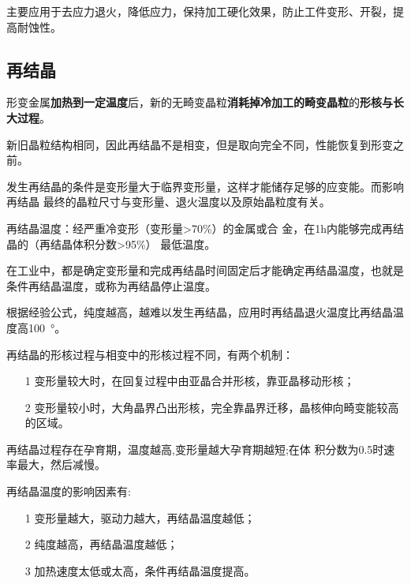             主要应用于去应力退火，降低应力，保持加工硬化效果，防止工件变形、开裂，提高耐蚀性。

        \subsection{再结晶}
            形变金属\textbf{加热到一定温度}后，新的无畸变晶粒\textbf{消耗掉冷加工的畸变晶粒}的\textbf{形核与长大过程}。

            新旧晶粒结构相同，因此再结晶不是相变，但是取向完全不同，性能恢复到形变之前。

            发生再结晶的条件是变形量大于临界变形量，这样才能储存足够的应变能。而影响再结晶
            最终的晶粒尺寸与变形量、退火温度以及原始晶粒度有关。

            再结晶温度：经严重冷变形（变形量>70\%）的金属或合
            金，在1h内能够完成再结晶的（再结晶体积分数>95\%）
            最低温度。
            
            在工业中，都是确定变形量和完成再结晶时间固定后才能确定再结晶温度，也就是条件再结晶温度，或称为再结晶停止温度。

            根据经验公式，纯度越高，越难以发生再结晶，应用时再结晶退火温度比再结晶温度高\SI{100}{\degree}。

            再结晶的形核过程与相变中的形核过程不同，有两个机制：
            \begin{itemize}
                \item[1] 变形量较大时，在回复过程中由亚晶合并形核，靠亚晶移动形核；
                \item[2] 变形量较小时，大角晶界凸出形核，完全靠晶界迁移，晶核伸向畸变能较高的区域。
            \end{itemize}

            再结晶过程存在孕育期，温度越高,变形量越大孕育期越短;在体
            积分数为0.5时速率最大，然后减慢。

            再结晶温度的影响因素有:
            \begin{itemize}
                \item[1] 变形量越大，驱动力越大，再结晶温度越低；
                \item[2] 纯度越高，再结晶温度越低；
                \item[3] 加热速度太低或太高，条件再结晶温度提高。
            \end{itemize}
            
